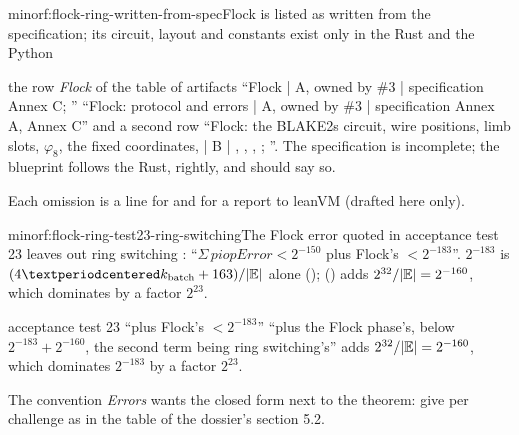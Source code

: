 \begin{finding}{minor}{f:flock-ring-written-from-spec}{Flock is listed as written from the
specification; its circuit, layout and constants exist only in the Rust and the Python}
\begin{change}{the row \emph{Flock} of the table of artifacts}
\asis \enquote{Flock | A, owned by \#3 | specification Annex C; }
\asproposed \enquote{Flock: protocol and errors | A, owned by \#3 | specification Annex A, Annex C}
and a second row \enquote{Flock: the BLAKE2s circuit, wire positions, limb slots, $φ_8$, the fixed
coordinates,  | B | ,
,
, ;
}.
\reason The specification is incomplete; the blueprint follows the Rust, rightly, and should
say so.
\end{change}
Each omission is a line for  and for a report to leanVM (drafted here
only).
\end{finding}

\begin{finding}{minor}{f:flock-ring-test23-ring-switching}{The Flock error quoted in acceptance
test 23 leaves out ring switching}
 : \enquote{$Σ\,\mathit{piopError} < 2^{-150}$ plus Flock's
$< 2^{-183}$}. $2^{-183}$ is $(4·k_{\mathrm{batch}} + 163)/|\E|$ alone ();
 () adds $2^{32}/|\mathbb{E}| = 2^{-160}$, which dominates by a factor
$2^{23}$.

\begin{change}{acceptance test 23}
\asis \enquote{plus Flock's $< 2^{-183}$}
\asproposed \enquote{plus the Flock phase's, below $2^{-183} + 2^{-160}$, the second term being
ring switching's}
\reason {} adds $2^{32}/|\mathbb{E}| = 2^{-160}$, which dominates $2^{-183}$ by a
factor $2^{23}$.
\end{change}
The convention \emph{Errors} wants the closed form next to the theorem: give  per
challenge as in the table of the dossier's section 5.2.
\end{finding}


